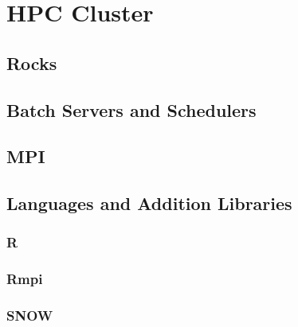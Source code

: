
\section{HPC Cluster}


\subsection{Rocks}


\subsection{Batch Servers and Schedulers}


\subsection{MPI}


\subsection{Languages and Addition Libraries}

\subsubsection{R}

\subsubsection{Rmpi}

\subsubsection{SNOW}
